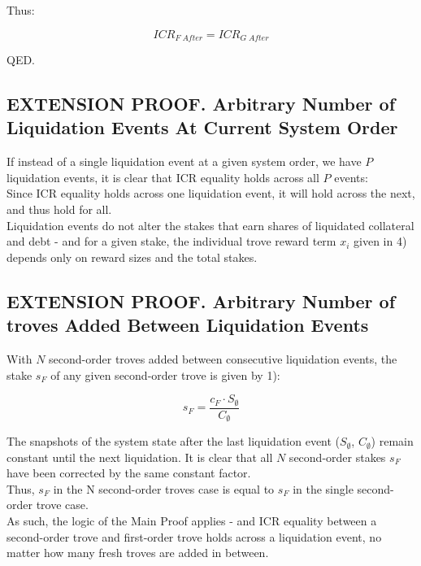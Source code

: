 \documentclass[reqno]{article}
\begin{document}
\bigskip
Thus:

\begin{equation} 
    ICR_{F \; After}=ICR_{G \; After}
\end{equation}

\bigskip
QED.

\subsection{EXTENSION PROOF. Arbitrary Number of Liquidation Events At Current System Order}

If instead of a single liquidation event at a given system order, we have $P$ liquidation events, it is clear that ICR equality holds across all $P$ events:\\

Since ICR equality holds across one liquidation event, it will hold across the next, and thus hold for all.\\

Liquidation events do not alter the stakes that earn shares of liquidated collateral and debt - and for a given stake, the individual trove reward term $x_i$ given in 4) depends only on reward sizes and the total stakes.

\subsection{EXTENSION PROOF. Arbitrary Number of troves Added Between Liquidation Events}

With $N$ second-order troves added between consecutive liquidation events, the stake $s_F$ of any given second-order trove is given by 1): 

\begin{equation} 
    s_F=\frac{c_F \cdot S_\emptyset}{C_\emptyset}
\end{equation}

\bigskip
The snapshots of the system state after the last liquidation event ($S_\emptyset$, $C_\emptyset$) remain constant until the next liquidation. It is clear that all $N$ second-order stakes $s_F$ have been corrected by the same constant factor.\\

Thus, $s_F$ in the N second-order troves case is equal to $s_F$ in the single second-order trove case.\\

As such, the logic of the Main Proof applies - and ICR equality between a second-order trove and first-order trove holds across a liquidation event, no matter how many fresh troves are added in between.
\end{document}
